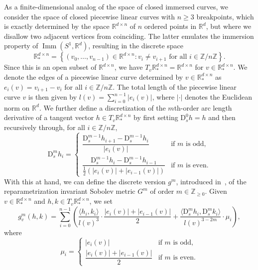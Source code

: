 \documentclass[11pt]{article}
\newcommand{\R}{\mathbb{R}}
\newcommand{\Z}{\mathbb{Z}}
\newcommand{\Db}{{\mathrm D}}
\begin{document}
As a finite-dimensional analog of the space of closed immersed curves, we consider the space of closed piecewise linear curves with $n\geq 3$ breakpoints, which is exactly determined by the space $\R^{d\times n}$ of $n$ ordered points in $\R^d$, but where we disallow two adjacent vertices from coinciding. The latter emulates the immersion property of $\operatorname{Imm}(S^1,\R^d)$, resulting in the discrete space
\begin{displaymath}
    \R_*^{d\times n}= \left\{(v_0,\dots,v_{n-1}) \in \R^{d\times n} : v_i\neq v_{i+1} \text{ for all }i\in \Z/n\Z\right\}.
\end{displaymath}
Since this is an open subset of $\R^{d\times n}$, we have $T_v\R_*^{d\times n} = \R^{d\times n}$ for $v\in \R_*^{d\times n}$.
We denote the edges of a piecewise linear curve determined by $v\in \R_*^{d\times n}$ as $e_i(v) = v_{i+1}-v_i$ for all $i\in \Z/n\Z$. The total length of the piecewise linear curve $v$ is then given by $l(v)=\sum_{i=0}^{n-1}|e_i(v)|$, where $|\cdot|$ denotes the Euclidean norm on $\R^d$. We further define a discretization of the $m$th-order arc length derivative of a tangent vector $h\in T_v\R_*^{d\times n}$ by first setting $\Db_s^0 h = h$ and then recursively through, for all $i\in \Z/n\Z$,
\begin{displaymath}
    \Db_s^m h_i = \begin{cases} \dfrac{\Db_s^{m-1}h_{i+1} - \Db_s^{m-1}h_{i}}{|e_i(v)|}& \text{if } m \text{ is odd,}\\[1em] \dfrac{\Db_s^{m-1}h_{i} - \Db_s^{m-1}h_{i-1}}{\frac{1}{2}\left(|e_i(v)|+|e_{i-1}(v)|\right)} & \text{if } m \text{ is even.} \end{cases}
\end{displaymath}
With this at hand, we can define the discrete version $g^m$, introduced in~\cite{cerqueira2024sobolevmetricsspacesdiscrete}, of the reparametrization invariant Sobolev metric $G^m$ of order $m\in\Z_{\geq 0}$. Given $v\in \R_*^{d\times n}$ and $h,k\in  T_v\R_*^{d\times n}$, we set
\begin{displaymath}
    g_v^m(h,k)=\sum_{i=0}^{n-1}\left(\frac{\langle h_i,k_i\rangle}{l(v)^3} \cdot \frac{|e_i(v)|+|e_{i-1}(v)|}{2} + \frac{\langle \Db_s^m h_i,\Db_s^m k_i\rangle}{l(v)^{3-2m}}\cdot\mu_i\right),
\end{displaymath}
where
\begin{displaymath}
    \mu_i =\begin{cases}
        |e_i(v)|& \text{if } m \text{ is odd,} \\[1em]
        \dfrac{|e_i(v)|+|e_{i-1}(v)|}{2}& \text{if } m \text{ is even.}
    \end{cases}
\end{displaymath}
\end{document}
